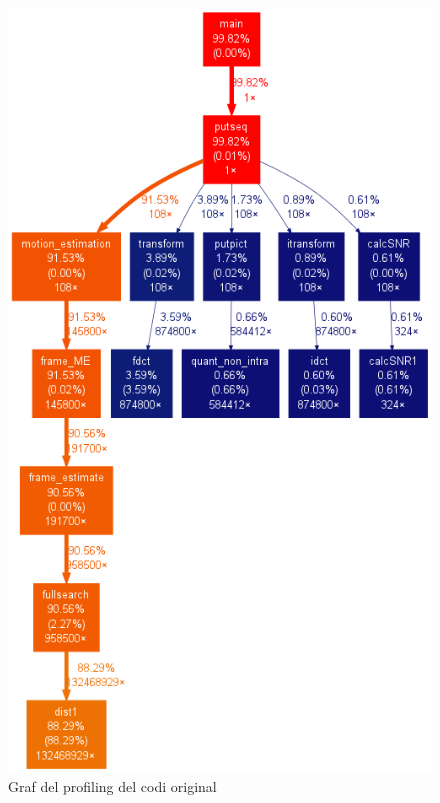 \begin{figure}[hbtp]
\begin{center}
\includegraphics[scale=0.4]{img/output.png}
\caption{Graf del profiling del codi original}
\end{center}
\end{figure}

